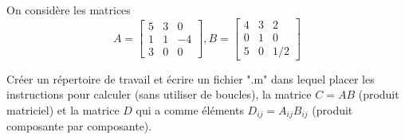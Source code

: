 On considère les matrices
\begin{equation*}
  A = \begin{bmatrix}
        5 & 3 & 0  \\
        1 & 1 & -4 \\
        3 & 0 & 0
      \end{bmatrix}
  ,
  B = \begin{bmatrix}
        4 & 3 & 2  \\
        0 & 1 & 0  \\
        5 & 0 & 1/2
      \end{bmatrix}
\end{equation*}

Créer un répertoire de travail et écrire un fichier ".m" dans lequel placer les instructions pour calculer (sans utiliser de boucles), la matrice $C = AB$ (produit matriciel) et la matrice $D$ qui a comme éléments $D_{ij} = A_{ij} B_{ij}$ (produit composante par composante).
